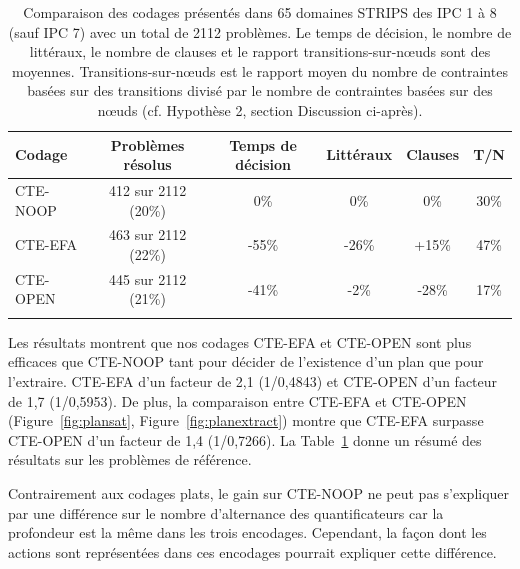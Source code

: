 \begin{table}
\centering
\begin{small}
\begin{tabular}{@{}lccccc@{}}
\toprule
Codage & Problèmes résolus & Temps de décision & Littéraux & Clauses & T/N \\ \midrule
CTE-NOOP & 412 sur 2112 (20\%) & 0\% & 0\% & 0\% & 30\% \\
CTE-EFA & 463 sur 2112 (22\%) & -55\% & -26\% & +15\% & 47\%  \\
CTE-OPEN & 445 sur 2112 (21\%) & -41\% & -2\% & -28\% & 17\% \\ \bottomrule
\\
\end{tabular}
\end{small}
\caption{Comparaison des codages présentés dans 65 domaines STRIPS des IPC 1 à 8 (sauf IPC 7) avec un total de 2112 problèmes. Le temps de décision, le nombre de littéraux, le nombre de clauses et le rapport transitions-sur-n\oe uds sont des moyennes. Transitions-sur-n\oe uds est le rapport moyen du nombre de contraintes basées sur des transitions divisé par le nombre de contraintes basées sur des n\oe uds (cf. Hypothèse 2, section Discussion ci-après).}
\label{fig:comparative}
\end{table}

Les résultats montrent que nos codages CTE-EFA et CTE-OPEN sont plus efficaces que CTE-NOOP tant pour décider de l'existence d'un plan que pour l'extraire. CTE-EFA d'un facteur de 2,1 (1/0,4843) et CTE-OPEN d'un facteur de 1,7 (1/0,5953).  De plus, la comparaison entre CTE-EFA et CTE-OPEN (Figure~\ref{fig:plansat}, Figure~\ref{fig:planextract}) montre que CTE-EFA surpasse CTE-OPEN d'un facteur de 1,4 (1/0,7266). La Table~\ref{fig:comparative} donne un résumé des résultats sur les problèmes de référence.


%

Contrairement aux codages plats, le gain sur CTE-NOOP ne peut pas s'expliquer par une différence sur le nombre d'alternance des quantificateurs car la profondeur est la même dans les trois encodages. Cependant, la façon dont les actions sont représentées dans ces encodages pourrait expliquer cette différence.


